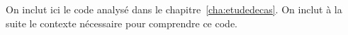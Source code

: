 On inclut ici le code analysé dans le chapitre~\ref{cha:etudedecas}. On inclut à
la suite le contexte nécessaire pour comprendre ce code.

{ \small
{}
}
